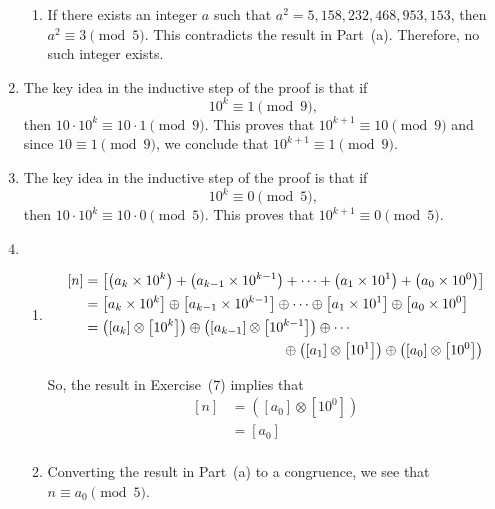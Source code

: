 \begin{enumerate}
\begin{enumerate}
\item If there exists an integer $a$ such that $a^2 = 5,158,232,468,953,153$, then 
$a^2 \equiv 3 \pmod 5$.  This contradicts the result in Part~(a).  Therefore, no such integer exists.
\end{enumerate}




\item The key idea in the inductive step of the proof is that if
\[
10^k \equiv 1 \pmod 9,
\]
then $10 \cdot 10^k \equiv 10 \cdot 1 \pmod 9$.  This proves that $10^{k+1} \equiv 10 \pmod 9$ and since $10 \equiv 1 \pmod 9$, we conclude that $10^{k+1} \equiv 1 \pmod 9$.

\item The key idea in the inductive step of the proof is that if
\[
10^k \equiv 0 \pmod 5,
\]
then $10 \cdot 10^k \equiv 10 \cdot 0 \pmod 5$.  This proves that $10^{k+1} \equiv 0 \pmod 5$.

\item \begin{enumerate}
\item 
\begin{align}
  \left[ n \right] &= \left[ {\left( {a_k  \times 10^k } \right) + \left( {a_{k - 1}  \times 10^{k - 1} } \right) +  \cdots  + \left( {a_1  \times 10^1 } \right) + \left( {a_0  \times 10^0 } \right)} \right] \notag \\ 
   &= \left[ {a_k  \times 10^k } \right] \oplus \left[ {a_{k - 1}  \times 10^{k - 1} } \right] \oplus  \cdots  \oplus \left[ {a_1  \times 10^1 } \right] \oplus \left[ {a_0  \times 10^0 } \right] \notag \\
  &= \left( {\left[ {a_k } \right] \otimes \left[ {10^k } \right]} \right) \oplus \left( {\left[ {a_{k - 1} } \right] \otimes \left[ {10^{k - 1} } \right]} \right) \oplus  \cdots \notag \\ 
  & \hspace{5cm} \oplus \left( {\left[ {a_1 } \right] \otimes \left[ {10^1 } \right]} \right) \oplus \left( {\left[ {a_0 } \right] \otimes \left[ {10^0 } \right]} \right) \notag  
\end{align}

So, the result in Exercise~(7) implies that
\[
\begin{aligned}
  \left[ n \right] &= \left( {\left[ {a_0 } \right] \otimes \left[ {10^0 } \right]} \right) \\ 
                   &= \left[ {a_0 } \right] \\ 
\end{aligned}
\]
\item Converting the result in Part~(a) to a congruence, we see that \\ 
$n \equiv  {a_0 }  \pmod 5$.


\end{enumerate}
\end{enumerate}
